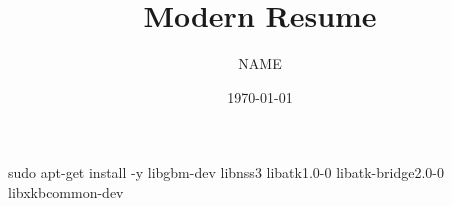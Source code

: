 \documentclass{article}
\title{Modern Resume}
\author{{{NAME}}}
\date{\today}
\begin{document}
\maketitle

sudo apt-get install -y libgbm-dev libnss3 libatk1.0-0 libatk-bridge2.0-0 libxkbcommon-dev
\end{document}

